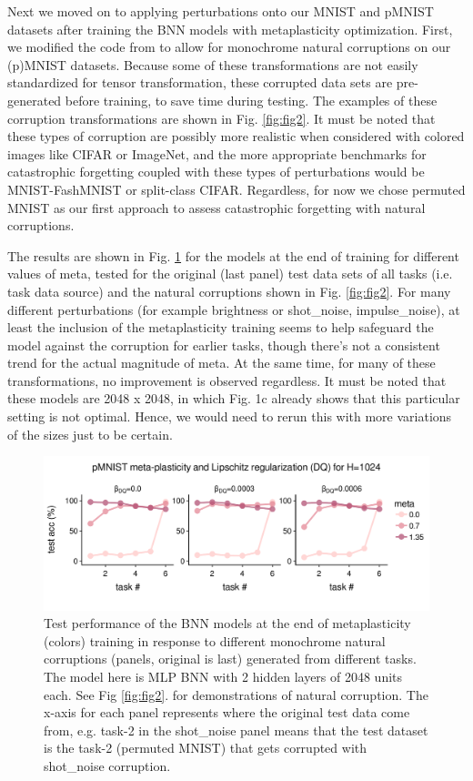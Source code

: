 \documentclass[manuscript,screen,review]{acmart}
\begin{document}
Next we moved on to applying perturbations onto our MNIST and pMNIST datasets after training the BNN models with metaplasticity optimization. First, we modified the code from \cite{Hendrycks_2018} to allow for monochrome natural corruptions on our (p)MNIST datasets. Because some of these transformations are not easily standardized for tensor transformation, these corrupted data sets are pre-generated before training, to save time during testing. The examples of these corruption transformations are shown in Fig. \ref{fig:fig2}. It must be noted that these types of corruption are possibly more realistic when considered with colored images like CIFAR or ImageNet, and the more appropriate benchmarks for catastrophic forgetting coupled with these types of perturbations would be MNIST-FashMNIST or split-class CIFAR. Regardless, for now we chose permuted MNIST as our first approach to assess catastrophic forgetting with natural corruptions.

The results are shown in Fig. \ref{fig:fig3} for the models at the end of training for different values of meta, tested for the original (last panel) test data sets of all tasks (i.e. task data source) and the natural corruptions shown in Fig. \ref{fig:fig2}. For many different perturbations (for example brightness or shot\_noise, impulse\_noise), at least the inclusion of the metaplasticity training seems to help safeguard the model against the corruption for earlier tasks, though there’s not a consistent trend for the actual magnitude of meta. At the same time, for many of these transformations, no improvement is observed regardless. It must be noted that these models are 2048 x 2048, in which Fig. 1c already shows that this particular setting is not optimal. Hence, we would need to rerun this with more variations of the sizes just to be certain. 


\begin{figure}[h]
    \centering
    \includegraphics[width=\textwidth]{figures/report/Fig3.pdf}
    \caption{Test performance of the BNN models at the end of metaplasticity (colors) training in response to different monochrome natural corruptions (panels, original is last) generated from different tasks. The model here is MLP BNN with 2 hidden layers of 2048 units each. See Fig \ref{fig:fig2}. for demonstrations of natural corruption. The x-axis for each panel represents where the original test data come from, e.g. task-2 in the shot\_noise panel means that the test dataset is the task-2 (permuted MNIST) that gets corrupted with shot\_noise corruption. }
    \label{fig:fig3}
\end{figure}
\end{document}
